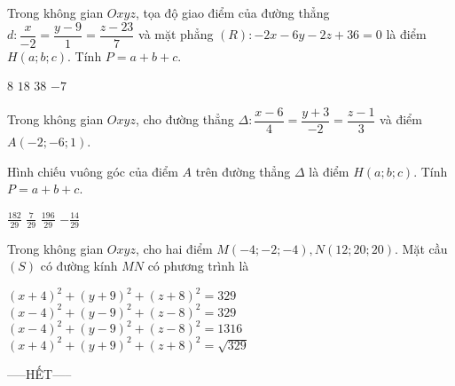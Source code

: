 \documentclass[12pt,a4paper]{article}
\begin{document}
\begin{ex}
 Trong không gian ${Oxyz}$, tọa độ giao điểm của đường thẳng ${d}:\dfrac{x}{-2}=\dfrac{y - 9}{1}=\dfrac{z - 23}{7}$ và mặt phẳng $(R):- 2 x - 6 y - 2 z + 36=0$ là điểm $H(a;b;c)$. Tính $P=a+b+c$.
 
\choice
{ \True ${8}$ }
   { ${18}$ }
     { ${38}$ }
    { ${-7}$ }
\end{ex}

\begin{ex}
 Trong không gian ${Oxyz}$, cho đường thẳng ${\Delta}:\dfrac{x - 6}{4}=\dfrac{y + 3}{-2}=\dfrac{z - 1}{3}$ và điểm $A(-2;-6;1)$.

 Hình chiếu vuông góc của điểm $A$ trên đường thẳng ${\Delta}$ là điểm $H(a;b;c)$. Tính $P=a+b+c$.
 
\choice
{ ${\frac{182}{29}}$ }
   { ${\frac{7}{29}}$ }
     { ${\frac{196}{29}}$ }
    { \True ${- \frac{14}{29}}$ }
\end{ex}

\begin{ex}
 Trong không gian ${Oxyz}$, cho hai điểm $M(-4;-2;-4),N(12;20;20)$. Mặt cầu ${(S)}$ có đường kính ${MN}$ có phương trình là
 
\choice
{ $\left(x + 4\right)^{2}+\left(y + 9\right)^{2}+\left(z + 8\right)^{2}=329$ }
   { \True $\left(x - 4\right)^{2}+\left(y - 9\right)^{2}+\left(z - 8\right)^{2}=329$ }
     { $\left(x - 4\right)^{2}+\left(y - 9\right)^{2}+\left(z - 8\right)^{2}=1316$ }
    { $\left(x + 4\right)^{2}+\left(y + 9\right)^{2}+\left(z + 8\right)^{2}=\sqrt{329}$ }
\end{ex}


 \begin{center}
-----HẾT-----
\end{center}

\end{document}
